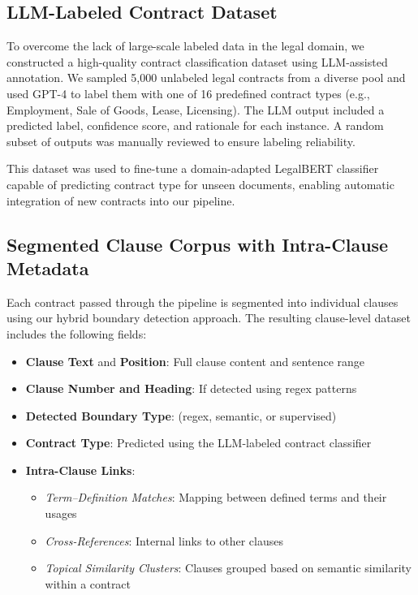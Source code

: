 \documentclass[11pt, oneside]{article}   	%
\begin{document}
\subsection*{LLM-Labeled Contract Dataset}

To overcome the lack of large-scale labeled data in the legal domain, we constructed a high-quality contract classification dataset using LLM-assisted annotation. We sampled 5,000 unlabeled legal contracts from a diverse pool and used GPT-4 to label them with one of 16 predefined contract types (e.g., Employment, Sale of Goods, Lease, Licensing). The LLM output included a predicted label, confidence score, and rationale for each instance. A random subset of outputs was manually reviewed to ensure labeling reliability.

This dataset was used to fine-tune a domain-adapted LegalBERT classifier capable of predicting contract type for unseen documents, enabling automatic integration of new contracts into our pipeline.

\subsection*{Segmented Clause Corpus with Intra-Clause Metadata}

Each contract passed through the pipeline is segmented into individual clauses using our hybrid boundary detection approach. The resulting clause-level dataset includes the following fields:

\begin{itemize}
    \item \textbf{Clause Text} and \textbf{Position}: Full clause content and sentence range
    \item \textbf{Clause Number and Heading}: If detected using regex patterns
    \item \textbf{Detected Boundary Type}: (regex, semantic, or supervised)
    \item \textbf{Contract Type}: Predicted using the LLM-labeled contract classifier
    \item \textbf{Intra-Clause Links}:
    \begin{itemize}
        \item \textit{Term--Definition Matches}: Mapping between defined terms and their usages
        \item \textit{Cross-References}: Internal links to other clauses 
        \item \textit{Topical Similarity Clusters}: Clauses grouped based on semantic similarity within a contract
    \end{itemize}
\end{itemize}
\end{document}
